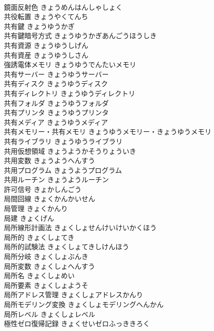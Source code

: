\documentclass[8pt]{extreport}
\begin{document}
\begin{CJK}{UTF8}{min}
\\	鏡面反射色	きょうめんはんしゃしょく	
\\	共役転置	きょうやくてんち	
\\	共有鍵	きょうゆうかぎ	
\\	共有鍵暗号方式	きょうゆうかぎあんごうほうしき	
\\	共有資源	きょうゆうしげん	
\\	共有資産	きょうゆうしさん	
\\	強誘電体メモリ	きょうゆうでんたいメモリ	
\\	共有サーバー	きょうゆうサーバー	
\\	共有ディスク	きょうゆうディスク	
\\	共有ディレクトリ	きょうゆうディレクトリ	
\\	共有フォルダ	きょうゆうフォルダ	
\\	共有プリンタ	きょうゆうプリンタ	
\\	共有メディア	きょうゆうメディア	
\\	共有メモリー・共有メモリ	きょうゆうメモリー・きょうゆうメモリ	
\\	共有ライブラリ	きょうゆうライブラリ	
\\	共用仮想領域	きょうようかそうりょういき	
\\	共用変数	きょうようへんすう	
\\	共用プログラム	きょうようプログラム	
\\	共用ルーチン	きょうようルーチン	
\\	許可信号	きょかしんごう	
\\	局間回線	きょくかんかいせん	
\\	局管理	きょくかんり	
\\	局建	きょくげん	
\\	局所線形計画法	きょくしょせんけいけいかくほう	
\\	局所的	きょくしょてき	
\\	局所的試験法	きょくしょてきしけんほう	
\\	局所分岐	きょくしょぶんき	
\\	局所変数	きょくしょへんすう	
\\	局所名	きょくしょめい	
\\	局所要素	きょくしょようそ	
\\	局所アドレス管理	きょくしょアドレスかんり	
\\	局所モデリング変換	きょくしょモデリングへんかん	
\\	局所レベル	きょくしょレベル	
\\	極性ゼロ復帰記録	きょくせいゼロふっききろく	

\end{CJK}
\end{document}
